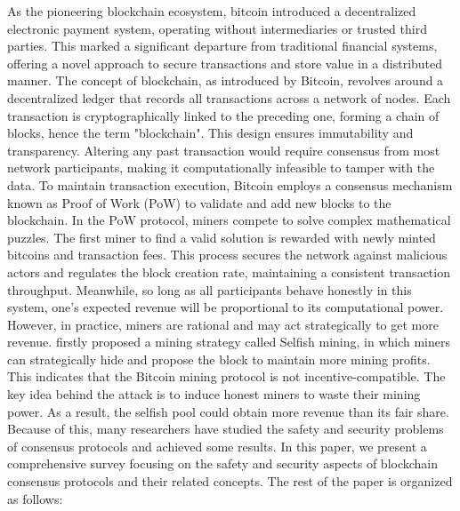 As the pioneering blockchain ecosystem, bitcoin \cite{nakamoto2008bitcoin} introduced a decentralized electronic payment system, operating without intermediaries or trusted third parties.
This marked a significant departure from traditional financial systems, offering a novel approach to secure transactions and store value in a distributed manner.
The concept of blockchain, as introduced by Bitcoin, revolves around a decentralized ledger that records all transactions across a network of nodes. 
Each transaction is cryptographically linked to the preceding one, forming a chain of blocks, hence the term "blockchain". 
This design ensures immutability and transparency. 
Altering any past transaction would require consensus from most network participants, making it computationally infeasible to tamper with the data.
%
To maintain transaction execution, Bitcoin employs a consensus mechanism known as Proof of Work (PoW) to validate and add new blocks to the blockchain. 
In the PoW protocol, miners compete to solve complex mathematical puzzles. 
The first miner to find a valid solution is rewarded with newly minted bitcoins and transaction fees. 
This process secures the network against malicious actors and regulates the block creation rate, maintaining a consistent transaction throughput.
Meanwhile, so long as all participants behave honestly in this system, one's expected revenue will be proportional to its computational power.
%
However, in practice, miners are rational and may act strategically to get more revenue.
\cite{eyal2014majority} firstly proposed a mining strategy called Selfish mining, in which miners can strategically hide and propose the block to maintain more mining profits.
This indicates that the Bitcoin mining protocol is not incentive-compatible.
The key idea behind the attack is to induce honest miners to waste
their mining power. 
As a result, the selfish pool could obtain more revenue than its fair share.
Because of this, many researchers have studied the safety and security problems of consensus protocols and achieved some results.
%
In this paper, we present a comprehensive survey focusing on the safety and security aspects of blockchain consensus protocols and their related concepts.
The rest of the paper is organized as follows:

